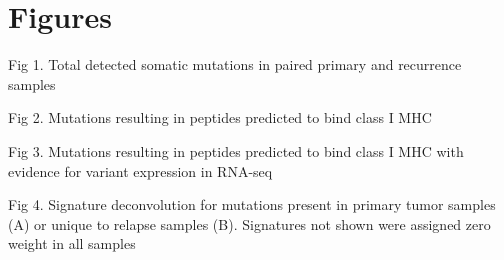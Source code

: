 \section{Figures}

Fig 1. Total detected somatic mutations in paired primary and recurrence samples

Fig 2. Mutations resulting in peptides predicted to bind class I MHC

Fig 3. Mutations resulting in peptides predicted to bind class I MHC with evidence for variant expression in RNA-seq

Fig 4. Signature deconvolution for mutations present in primary tumor samples (A) or unique to relapse samples (B). Signatures not shown were assigned zero weight in all samples